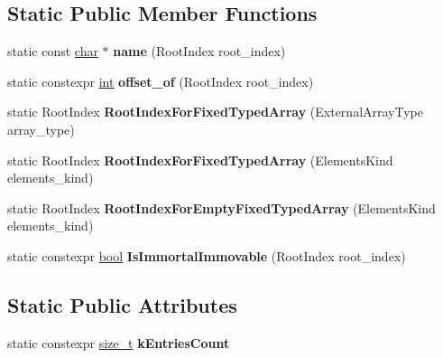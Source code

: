 \subsection*{Static Public Member Functions}
\begin{DoxyCompactItemize}
\item 
\mbox{\label{classv8_1_1internal_1_1RootsTable_a945eaf0ea345cd607471f086c43e800b}} 
static const \mbox{\hyperlink{classchar}{char}} $\ast$ {\bfseries name} (Root\+Index root\+\_\+index)
\item 
\mbox{\label{classv8_1_1internal_1_1RootsTable_a6c13d48fef78917e42206eea04eb06b6}} 
static constexpr \mbox{\hyperlink{classint}{int}} {\bfseries offset\+\_\+of} (Root\+Index root\+\_\+index)
\item 
\mbox{\label{classv8_1_1internal_1_1RootsTable_a71305e9bda1588afa66ce636cceb607c}} 
static Root\+Index {\bfseries Root\+Index\+For\+Fixed\+Typed\+Array} (External\+Array\+Type array\+\_\+type)
\item 
\mbox{\label{classv8_1_1internal_1_1RootsTable_a84cfccd5cad4f51e8c04fc7b00248aef}} 
static Root\+Index {\bfseries Root\+Index\+For\+Fixed\+Typed\+Array} (Elements\+Kind elements\+\_\+kind)
\item 
\mbox{\label{classv8_1_1internal_1_1RootsTable_a9578e4cbdcd73af0e6ffc151bf5714a9}} 
static Root\+Index {\bfseries Root\+Index\+For\+Empty\+Fixed\+Typed\+Array} (Elements\+Kind elements\+\_\+kind)
\item 
\mbox{\label{classv8_1_1internal_1_1RootsTable_ae3e6a29a5337c7e29ef16cf6ead8ba75}} 
static constexpr \mbox{\hyperlink{classbool}{bool}} {\bfseries Is\+Immortal\+Immovable} (Root\+Index root\+\_\+index)
\end{DoxyCompactItemize}
\subsection*{Static Public Attributes}
\begin{DoxyCompactItemize}
\item 
static constexpr \mbox{\hyperlink{classsize__t}{size\+\_\+t}} {\bfseries k\+Entries\+Count}
\end{DoxyCompactItemize}
